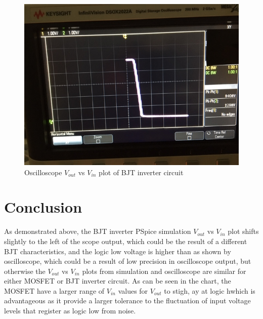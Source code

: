 \documentclass{article}
\begin{document}
\begin{figure}[H]
  \centering
  \includegraphics[width=\textwidth]{ECE2200L_Lab9_PSpice_scope_B.JPG}
  \caption{Oscilloscope $V_{out}$ vs $V_{in}$ plot of BJT inverter circuit}
  \label{fig:plotb}
\end{figure}



\section*{Conclusion}
As demonstrated above, the BJT inverter PSpice simulation $V_{out}$ vs $V_{in}$ plot shifts slightly to the left of the scope output, which could be the result of a different BJT characteristics, and the logic low voltage is higher than as shown by oscilloscope, which could be a result of low precision in oscilloscope output, but otherwise the $V_{out}$ vs $V_{in}$ plots from simulation and oscilloscope are similar for either MOSFET or BJT inverter circuit. As can be seen in the chart, the MOSFET have a larger range of $V_{in}$ values for $V_{out}$ to stigh, ay at logic hwhich is advantageous as it provide a larger tolerance to the fluctuation of input voltage levels that register as logic low from noise.
\end{document}
